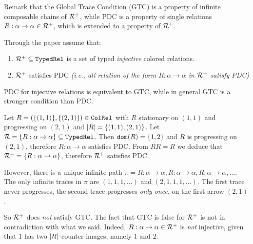 \documentclass{lmcs}
\newenvironment{example}[1][Example]
{\begin{trivlist} \item[\hskip \labelsep {\bfseries #1}]}{\end{trivlist}}
\begin{document}
Remark that the Global Trace Condition (GTC) is a property of infinite composable
chains of ${\mathcal R}^+$, while PDC is a property of single relations
$R:\alpha \rightarrow \alpha \in {\mathcal R}^+$, which is extended to a property of  ${\mathcal R}^+$. 

Through the paper assume that:

\begin{enumerate}
\item  
${\mathcal R}^+ \subseteq {\tt TypedRel}$ is a set of typed \emph{injective} colored relations.
\item
${\mathcal R}^+$ satisfies PDC
 \emph{(i.e., all relation of the form $R:\alpha \rightarrow \alpha$ in ${\mathcal R}^+$ satisfy PDC)}
\end{enumerate}

PDC for injective relations is equivalent to GTC, while in general GTC is a stronger condition
than PDC. 
\\

\begin{example}
\label{example-PDC-GTC}
Let $R = (\{(1,1)\},\{(2,1)\}) \in {\tt ColRel}$ with $R$ stationary on $(1,1)$
and progressing on $(2,1)$ and  ${| R |} = \{(1,1),(2,1)\}$. 
Let ${\mathcal R}=\{R: \alpha \rightarrow \alpha\} \subseteq {\tt TypedRel}$.
Then ${\tt dom}(R) = \{1,2\}$ and $R$ is progressing on $(2,1)$, therefore 
$R: \alpha \rightarrow \alpha$ satisfies PDC. From $RR=R$ we deduce that  
${\mathcal R}^+=\{R: \alpha \rightarrow \alpha\}$, therefore ${\mathcal R}^+$ satisfies PDC. 

However, there is a unique infinite path 
$
\pi = 
R: \alpha \rightarrow \alpha, R: \alpha \rightarrow \alpha, R: \alpha \rightarrow \alpha, \ldots$.
The only infinite traces in $\pi$ are $(1,1,1,\ldots)$ and $(2,1,1,1,\ldots)$. The first trace never progresses, the second trace progresses \emph{only once}, on the first arrow $(2,1)$. 

So ${\mathcal R}^+$ does \emph{not} satisfy GTC. The fact that GTC is false for ${\mathcal R}^+$ 
is not in contradiction with what we said. Indeed, $R: \alpha \rightarrow \alpha \in {\mathcal R}^+$ 
is  \emph{not} injective, given that $1$ has two ${| R |}$-counter-images, 
namely $1$ and $2$.
\end{example}
\end{document}
